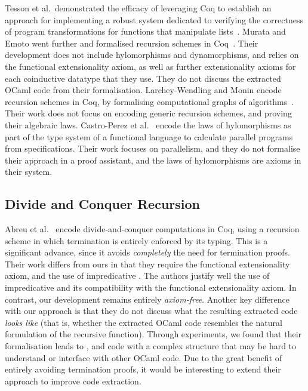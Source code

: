 \documentclass{llncs}
\newcommand{\mvol}[1]{\textcolor{blue}{\textsc{Michael}: #1}}
\begin{document}
Tesson et al.\ demonstrated the efficacy of leveraging Coq to establish an
approach for implementing a robust system dedicated to verifying the correctness
of program transformations for functions that manipulate
lists~\cite{10.1007/978-3-642-17796-5_10}. Murata and Emoto went further and
formalised recursion schemes in Coq~\cite{MurataE19}. Their development does not
include hylomorphisms and dynamorphisms, and relies on the functional
extensionality axiom, as well as further extensionality axioms for each
coinductive datatype that they use. They do not discuss the extracted OCaml code
from their formalisation. Larchey-Wendling and Monin encode recursion schemes in
Coq, by formalising computational graphs of algorithms~\cite{larchey2022braga}.
Their work does not focus on encoding generic recursion schemes, and proving
their algebraic laws. Castro-Perez et al.~\cite{farmsCastro} encode the laws of
hylomorphisms as part of the type system of a functional language to calculate
parallel programs from specifications. Their work focuses on parallelism, and
they do not formalise their approach in a proof assistant, and the laws of
hylomorphisms are axioms in their system.

\subsection{Divide and Conquer Recursion}\label{sec:reccoq}

Abreu et al.~\cite{AbreuDHJMS23} encode divide-and-conquer computations in Coq,
using a recursion scheme in which termination is entirely enforced by its
typing.  This is a significant advance, since it avoids \emph{completely} the
need for termination proofs. Their work differs from ours in that they require
the functional extensionality axiom, and the use of impredicative .
The authors justify well the use of impredicative  and its
compatibility with the functional extensionality axiom. In contrast, our
development remains entirely \emph{axiom-free}. Another key difference with our
approach is that they do not discuss what the resulting extracted code
\emph{looks like} (that is, whether the extracted OCaml code resembles the
natural formulation of the recursive function). Through experiments, we found
that their formalisation leads to , and code with a complex
structure that may be hard to understand or interface with other OCaml code.
Due to the great benefit of entirely avoiding termination proofs, it would be
interesting to extend their approach to improve code extraction.
\end{document}
